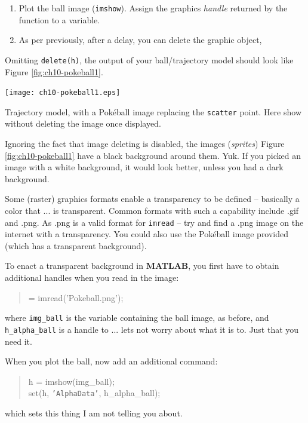 \documentclass{tufte-book} %
\newenvironment{docspec}{\begin{quotation}\ttfamily\parskip0pt\parindent0pt\ignorespaces}{\end{quotation}}
\begin{document}
\begin{enumerate}[noitemsep]
\item Plot the ball image (\texttt{imshow}). Assign the graphics \textit{handle} returned by the function to a variable.

\item As per previously, after a delay, you can delete the graphic object,

\end{enumerate}

Omitting \texttt{delete(h)}, the output of your ball/trajectory model should look like Figure \ref{fig:ch10-pokeball1}.

\begin{marginfigure}[0.0in]
\texttt{[image: ch10-pokeball1.eps]}
\caption{Trajectory model, with a Pok\'eball image replacing the \texttt{scatter} point. Here show without deleting the image once displayed.}
\label{fig:ch10-pokeball1}
\end{marginfigure}

Ignoring the fact that image deleting is disabled, the images (\textit{sprites}) Figure \ref{fig:ch10-pokeball1} have a black background around them. Yuk. If you picked an image with a white background, it would look better, unless you had a dark background.

Some (raster) graphics formats enable a transparency to be defined -- basically a color that ... is transparent. Common formats with such a capability include \textsf{.gif} and \textsf{.png}. As \textsf{.png} is a valid format for \texttt{imread} -- try and find a \textsf{.png} image on the internet with a transparency. You could also use the Pok\'eball image provided (which has a transparent background).

To enact a transparent background in \textbf{MATLAB}, you first have to obtain additional handles when you read in the image:
\begin{docspec}
[img\_ball, h\_map\_ball, h\_alpha\_ball] = imread(\textcolor[rgb]{1,0,1}{'Pokeball.png'});
\end{docspec}
where \texttt{img\_ball} is the variable containing the ball image, as before, and \texttt{h\_alpha\_ball} is a handle to ... lets not worry about what it is to. Just that you need it.

When you plot the ball, now add an additional command:
\begin{docspec}
    h = imshow(img\_ball);\\
    set(h, \texttt{'AlphaData'}, h\_alpha\_ball);
\end{docspec}
which sets this thing I am not telling you about.
\end{document}
